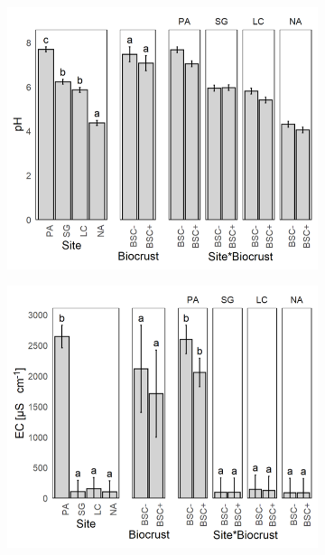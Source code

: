 \begin{figure}[htbp] %
    \centering %

    \begin{subfigure}[b]{0.32\textwidth} %
        \centering
        \includegraphics[width=\linewidth]{img/M1-Figure_2-01.png}
    \end{subfigure}
    \hfill %
    \begin{subfigure}[b]{0.32\textwidth}
        \centering
        \includegraphics[width=\linewidth]{img/M1-Figure_2-02.png}

\end{subfigure}
\end{figure}
